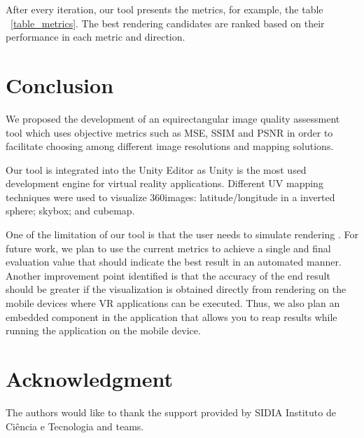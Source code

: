 \documentclass[10pt,conference,pdftex]{IEEEtran}
\begin{document}
After every iteration, our tool presents the metrics, for example, the table ~\ref{table_metrics}. The best rendering candidates are ranked based on their performance in each metric and direction.

\section{Conclusion}\label{sec:conclusion}

We proposed the development of an equirectangular image quality assessment tool which uses objective metrics such as MSE, SSIM and PSNR in order to facilitate choosing among different image resolutions and mapping solutions.

Our tool is integrated into the Unity Editor as Unity is the most used development engine for virtual reality applications. Different UV mapping techniques were used to visualize 360\degree images: latitude/longitude in a inverted sphere; skybox; and cubemap.

One of the limitation of our tool is that the user needs to simulate rendering . For future work, we plan to use the current metrics to achieve a single and final evaluation value that should indicate the best result in an automated manner. Another improvement point identified is that the accuracy of the end result should be greater if the visualization is obtained directly from rendering on the mobile devices where VR applications can be executed. Thus, we also plan an embedded component in the application that allows you to reap results while running the application on the mobile device.


\section*{Acknowledgment}
The authors would like to thank the support provided by SIDIA Instituto de Ciência e Tecnologia and teams.

\end{document}
